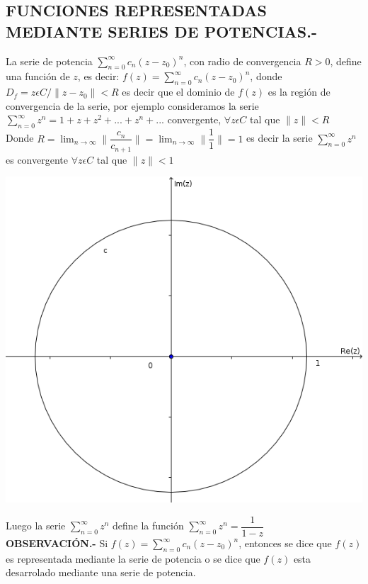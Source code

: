 \documentclass[10pt,a4paper]{article}
\begin{document}
\subsection{FUNCIONES REPRESENTADAS MEDIANTE SERIES DE POTENCIAS.-}
La serie de potencia  $\displaystyle{\sum_{n = 0}^{\infty} c_n (z-z_0)^n}$, con radio de convergencia $R>0$, define una función de $z$, es decir:  $\displaystyle{f(z) = \sum_{n = 0}^{\infty} c_n (z-z_0)^n}$, donde $\displaystyle{D_f = {z  \epsilon  C  /  \parallel z - z_0 \parallel < R}}$ es decir que el dominio de $f(z)$ es la región de convergencia de la serie, por ejemplo consideramos la serie $\displaystyle{\sum_{n = 0}^{\infty} z^n = 1 + z + z^2 + ... + z^n+...}$ convergente, $\displaystyle{\forall z \epsilon C}$ tal que $\parallel z \parallel < R$ \\
Donde $\displaystyle{R = \lim_{n \to \infty} \parallel \dfrac{c_n}{c_{n+1}} \parallel = \lim_{n \to \infty} \parallel \dfrac{1}{1} \parallel = 1 }$ es decir la serie $\displaystyle{\sum_{n = 0}^{\infty} z^n}$ es convergente $\forall z \epsilon C$ tal que $\parallel z \parallel < 1$
\begin{center}
\includegraphics[scale=0.5]{2.png}
\end{center}
Luego la serie $\displaystyle{\sum_{n = 0}^{\infty} z^n}$ define la función $\displaystyle{\sum_{n = 0}^{\infty} z^n = \dfrac{1}{1-z}}$\\
\textbf{OBSERVACIÓN.-} Si $\displaystyle{f(z) = \sum_{n = 0}^{\infty} c_n (z-z_0)^n}$, entonces se dice que $f(z)$ es representada mediante la serie de potencia o se dice que $f(z)$ esta desarrolado mediante una serie de potencia.
\end{document}
